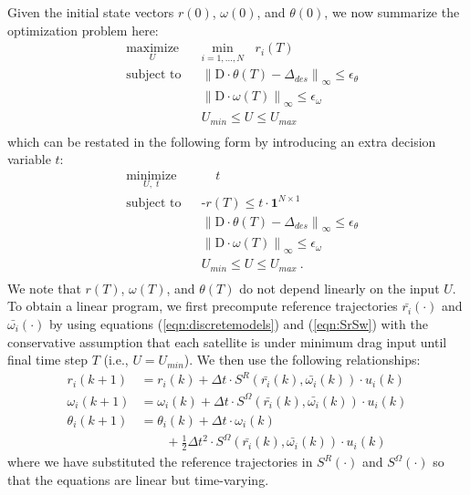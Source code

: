 \documentclass[letterpaper, 10 pt, conference]{ieeeconf}  %
\begin{document}
Given the initial state vectors $r(0)$, $\omega(0)$, and $\theta(0)$, we now summarize the optimization problem here:
\begin{equation}
\begin{aligned}
& \underset{U}{\text{maximize}}
& & \underset{i = 1, \ldots, N}{\text{min}}  \ \ \ \ r_i(T)\\
& \text{subject to}
& & {\lVert \text{D} \cdot \theta(T) - \Delta_{des} \rVert}_{\infty} \leq \epsilon_{\theta} \\
& & & {\lVert \text{D} \cdot \omega(T) \rVert}_{\infty} \leq \epsilon_{\omega}  \\
& & & U_{min}  \leq U \leq U_{max} \\
\end{aligned}
\end{equation}
which can be restated in the following form by introducing an extra decision variable $t$:
\begin{equation}
\begin{aligned}
& \underset{U, \; t}{\text{minimize}}
& & \ \ \ \ \ t \\
& \text{subject to}
& & \text{-}r(T) \leq t \cdot \mathbf{1}^{N \times 1} \\
& & & {\lVert \text{D} \cdot \theta(T) - \Delta_{des} \rVert}_{\infty} \leq \epsilon_{\theta} \\
& & & {\lVert \text{D} \cdot \omega(T) \rVert}_{\infty} \leq \epsilon_{\omega}  \\
& & & U_{min}  \leq U \leq U_{max}  \ . \\
\end{aligned}
\end{equation}
We note that $r(T)$, $\omega(T)$, and $\theta(T)$ do not depend linearly on the input $U$. To obtain a linear program, we first precompute reference trajectories $\bar{r_i}(\cdot)$ and $\bar{\omega_i}(\cdot)$ by using equations (\ref{eqn:discretemodels}) and (\ref{eqn:SrSw}) with the conservative assumption that each satellite is under minimum drag input until final time step $T$ (i.e., $U = U_{min}$). We then use the following relationships:
\begin{subequations} 
\begin{align}
r_i(k+1) &= r_i(k) + \Delta t \cdot S^{R} ( \bar{r_i} (k),\bar{\omega_i} (k)) \cdot u_i(k) \\
\omega_i(k+1) &= \omega_i(k) + \Delta t \cdot S^{\Omega}( \bar{r_i} (k),\bar{\omega_i} (k)) \cdot u_i(k) \\
\theta_i(k+1) &= \theta_i(k)+ \Delta t \cdot \omega_i(k) \\
                     & \ \ \ \ \ \ \ \ \ + \tfrac{1}{2} \Delta t^2 \cdot S^{\Omega} ( \bar{r_i} (k),\bar{\omega_i} (k)) \cdot u_i(k) \nonumber
\end{align}
\label{eqn:discreteapproximatemodels}%
\end{subequations}
where we have substituted the reference trajectories in $S^R(\cdot)$ and $S^\Omega(\cdot)$ so that the equations are linear but time-varying.
\end{document}
